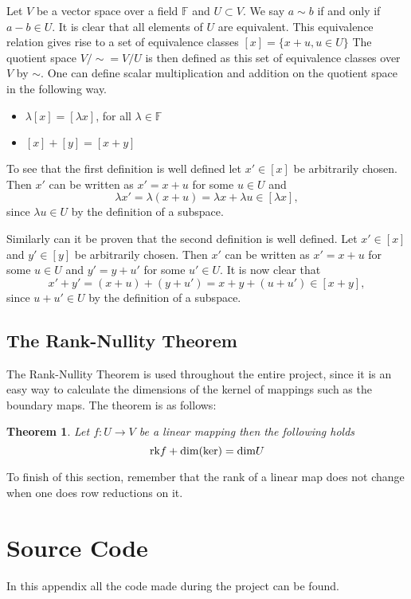 \documentclass[11pt,a4paper,twoside]{report}
\newtheorem{mythm}{Theorem}[chapter]
\begin{document}
Let $V$ be a vector space over a field $\mathbb{F}$ and $U\subset V$. We say $a\sim b$ if and only if $a-b\in U$. It is clear that all elements of $U$ are equivalent.
This equivalence relation gives rise to a set of equivalence classes $[x]=\{x+u,u\in U\}$
The quotient space $V/\sim = V/U$ is then defined as this set of equivalence classes over $V$ by $\sim$.
One can define scalar multiplication and addition on the quotient space in the following way. \cite{wikiQuo}
\begin{itemize}
\item $\lambda[x]=[\lambda x]$, for all $\lambda\in\mathbb{F}$
\item $[x]+[y]=[x+y]$
\end{itemize}
To see that the first definition is well defined let $x'\in[x]$ be arbitrarily chosen. Then $x'$ can be written as $x'=x+u$ for some $u\in U$ and 
\begin{equation*}
\lambda x' = \lambda (x + u) = \lambda x + \lambda u \in [\lambda x],
\end{equation*}
since $\lambda u \in U$ by the definition of a subspace.

Similarly can it be proven that the second definition is well defined. Let $x'\in[x]$ and $y'\in [y]$ be arbitrarily chosen. Then $x'$ can be written as $x'=x+u$ for some $u\in U$ and $y' = y+u'$ for some $u'\in U$. It is now clear that
\begin{equation*}
x'+y'=(x+u)+(y+u')=x+y+(u+u')\in [x+y],
\end{equation*}
since $u+u'\in U$ by the definition of a subspace.


\section{The Rank-Nullity Theorem}
The Rank-Nullity Theorem is used throughout the entire project, since it is an easy way to calculate the dimensions of the kernel of mappings such as the boundary maps. The theorem is as follows\cite[p. 109]{LinAlg}: 
\begin{mythm}\label{thm:rank_nullity}
Let $f:U\to V$ be a linear mapping then the following holds
\begin{equation*}
\textnormal{rk}f+\textnormal{dim}(\textnormal{ker})=\textnormal{dim}U
\end{equation*}
\end{mythm}

To finish of this section, remember that the rank of a linear map does not change when one does row reductions on it.

\chapter{Source Code}
In this appendix all the code made during the project can be found.










\end{document}
